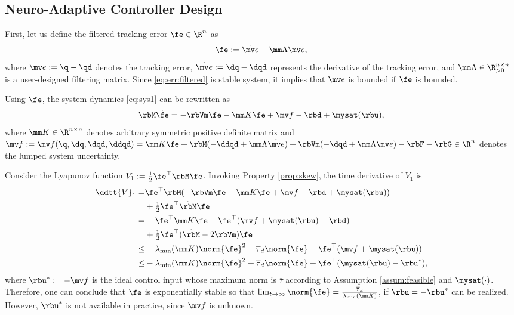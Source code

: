 \documentclass[final,5p,times,twocolumn,authoryear]{elsarticle}
\begin{document}
\subsection{Neuro-Adaptive Controller Design}\label{sec:sub:NAC}

First, let us define the filtered tracking error $\fe\in\R^n$ as 
\begin{equation}
    \fe := \dot{\mv e}-\mm\Lambda \mv e
    ,
    \label{eq:err:filtered}
\end{equation}
where $\mv e := \q - \qd$ denotes the tracking error, $\dot{\mv e} := \dq - \dqd$ represents the derivative of the tracking error, and $\mm\Lambda\in\R^{n\times n}_{>0}$ is a user-designed filtering matrix.
Since \eqref{eq:err:filtered} is stable system, it implies that $\mv e$ is bounded if $\fe$ is bounded.

Using $\fe$, the system dynamics \eqref{eq:sys1} can be rewritten as
\begin{equation}
    \rbM \dot\fe
    =
    -\rbVm \fe
    -\mm K \fe
    + \mv f
    -\rbd + \mysat(\rbu)
    ,
    \label{eq:sys:filtered}
\end{equation}
where $\mm K\in\R^{n\times n}$ denotes arbitrary symmetric positive definite matrix and $
    \mv f:= \mv f(\q,\dq,\dqd,\ddqd)
    =
    \mm K \fe
    +\rbM(-\ddqd+\mm\Lambda\dot{\mv e})
    +
    \rbVm(-\dqd+\mm\Lambda\mv e)
    -
    \rbF
    -
    \rbG
    \in\R^n
$ denotes the lumped system uncertainty.

Consider the Lyapunov function $V_1:= \tfrac{1}{2}\fe^\top \rbM\fe$. 
Invoking Property \ref{prop:skew}, the time derivative of $V_1$ is
\begin{equation}
    \begin{aligned}
        \ddtt{V}_1
        =&
        \fe^\top \rbM (
            -\rbVm \fe -\mm K \fe + \mv f
            -\rbd + \mysat(\rbu)
        )
        \\
        &
        +
        \tfrac{1}{2}
        \fe^\top \dot{\rbM}\fe
        \\
        =&
        -
        \fe^\top \mm K \fe 
        +
        \fe^\top (
            \mv f+\mysat(\rbu)
            -\rbd
        )
        \\
        &
        +
        \tfrac{1}{2}
        \fe^\top(\dot{\rbM}- 2\rbVm)\fe
        \\
        \le&
        -\lambda_{\min}(\mm K)\norm{\fe}^2
        +
        \overline\tau_d\norm{\fe}
        +
        \fe^\top (\mv f+\mysat(\rbu))
        \\
        \le&
        -\lambda_{\min}(\mm K)\norm{\fe}^2
        +
        \overline\tau_d\norm{\fe}
        +
        \fe^\top (\mysat(\rbu)-\rbu^*)
        ,
    \end{aligned}
    \label{eq:lya1:dot1}
\end{equation}
where $\rbu^*:= -\mv f$ is the ideal control input whose maximum norm is $\overline\tau$ according to Assumption \ref{assum:feasible} and $\mysat(\cdot)$. 
Therefore, one can conclude that $\fe$ is exponentially stable so that $\lim_{t\to\infty}\norm{\fe}=\tfrac{\overline\tau_d}{\lambda_{\min}(\mm K)}$, if $\rbu=-\rbu^*$ can be realized.
However, $\rbu^*$ is not available in practice, since $\mv f$ is unknown.
\end{document}
